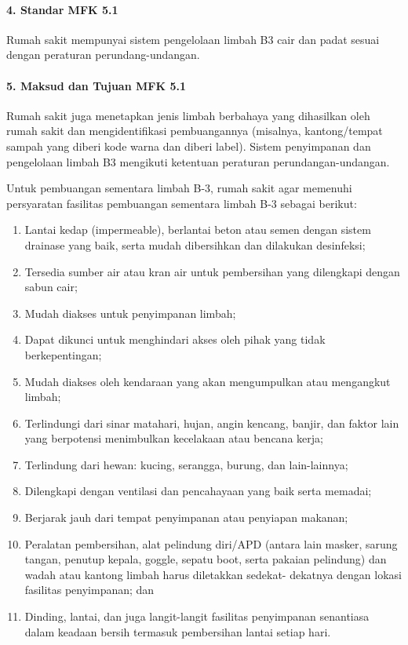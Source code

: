 \documentclass[
]{book}
\providecommand{\tightlist}{%
  \setlength{\itemsep}{0pt}\setlength{\parskip}{0pt}}
\begin{document}
\hypertarget{standar-mfk-5.1}{%
\paragraph*{4. Standar MFK 5.1}\label{standar-mfk-5.1}}

Rumah sakit mempunyai sistem pengelolaan limbah B3 cair dan padat sesuai dengan peraturan perundang-undangan.

\hypertarget{maksud-dan-tujuan-mfk-5.1}{%
\paragraph*{5. Maksud dan Tujuan MFK 5.1}\label{maksud-dan-tujuan-mfk-5.1}}

Rumah sakit juga menetapkan jenis limbah berbahaya yang dihasilkan oleh rumah sakit dan mengidentifikasi pembuangannya (misalnya, kantong/tempat sampah yang diberi kode warna dan diberi label).
Sistem penyimpanan dan pengelolaan limbah B3 mengikuti ketentuan peraturan perundangan-undangan.

Untuk pembuangan sementara limbah B-3, rumah sakit agar memenuhi persyaratan fasilitas pembuangan sementara limbah B-3 sebagai berikut:

\begin{enumerate}
\def\labelenumi{\alph{enumi}.}
\tightlist
\item
  Lantai kedap (impermeable), berlantai beton atau semen dengan sistem drainase yang baik, serta mudah dibersihkan dan dilakukan desinfeksi;
\item
  Tersedia sumber air atau kran air untuk pembersihan yang dilengkapi dengan sabun cair;
\item
  Mudah diakses untuk penyimpanan limbah;
\item
  Dapat dikunci untuk menghindari akses oleh pihak yang tidak berkepentingan;
\item
  Mudah diakses oleh kendaraan yang akan mengumpulkan atau mengangkut limbah;
\item
  Terlindungi dari sinar matahari, hujan, angin kencang, banjir, dan faktor lain yang berpotensi menimbulkan kecelakaan atau bencana kerja;
\item
  Terlindung dari hewan: kucing, serangga, burung, dan lain-lainnya;
\item
  Dilengkapi dengan ventilasi dan pencahayaan yang baik serta memadai;
\item
  Berjarak jauh dari tempat penyimpanan atau penyiapan makanan;
\item
  Peralatan pembersihan, alat pelindung diri/APD (antara lain masker, sarung tangan, penutup kepala, goggle, sepatu boot, serta pakaian pelindung) dan wadah atau kantong limbah harus diletakkan sedekat- dekatnya dengan lokasi fasilitas penyimpanan; dan
\item
  Dinding, lantai, dan juga langit-langit fasilitas penyimpanan senantiasa dalam keadaan bersih termasuk pembersihan lantai setiap hari.
\end{enumerate}
\end{document}
